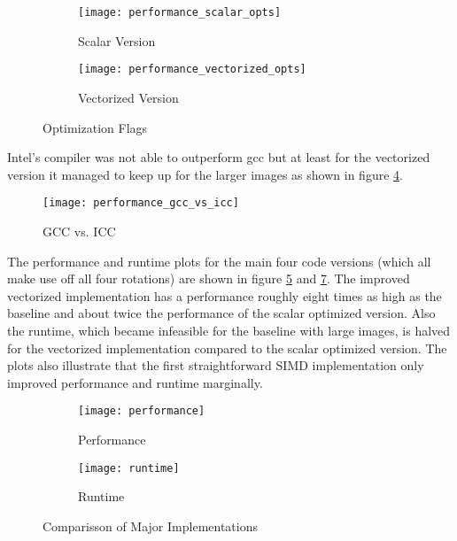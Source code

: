 \begin{figure}[H]
  \begin{subfigure}[t]{\linewidth}
    \centering
    \texttt{[image: performance\_scalar\_opts]}
    \caption{Scalar Version}
    \label{fig:perf_scal}
  \end{subfigure}
  \begin{subfigure}[b]{\linewidth}
    \centering
    \texttt{[image: performance\_vectorized\_opts]}
    \caption{Vectorized Version}
    \label{fig:perf_vec}
  \end{subfigure}
  \caption{Optimization Flags}
\end{figure}


Intel's compiler was not able to outperform gcc but at least for the vectorized
version it managed to keep up for the larger images as shown in figure
\ref{fig:perf_gcc_vs_icc}.

\begin{figure}[H]
  \centering
  \texttt{[image: performance\_gcc\_vs\_icc]}
  \caption{GCC vs. ICC}
  \label{fig:perf_gcc_vs_icc}
\end{figure}

 The performance and runtime plots for the main four code
versions (which all make use off all four rotations) are shown in figure
\ref{fig:perf} and \ref{fig:runtime}. The improved vectorized implementation has
a performance roughly eight times as high as the baseline and about twice the
performance of the scalar optimized version. Also the runtime, which became
infeasible for the baseline with large images, is halved for the vectorized
implementation compared to the scalar optimized version. The plots also
illustrate that the first straightforward SIMD implementation only improved
performance and runtime marginally.

\begin{figure}[H]
  \begin{subfigure}[t]{\linewidth}
    \centering
    \texttt{[image: performance]}
    \caption{Performance}
    \label{fig:perf}
  \end{subfigure}
  \begin{subfigure}[t]{\linewidth}
    \centering
    \texttt{[image: runtime]}
    \caption{Runtime}
    \label{fig:runtime}
  \end{subfigure}
  \caption{Comparisson of Major Implementations}
\end{figure}

